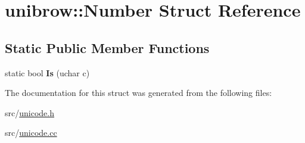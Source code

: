 \hypertarget{structunibrow_1_1_number}{}\section{unibrow\+:\+:Number Struct Reference}
\label{structunibrow_1_1_number}
\subsection*{Static Public Member Functions}
\begin{DoxyCompactItemize}
\item 
\hypertarget{structunibrow_1_1_number_a386425bc3c0465d965e380e7fd2d0f87}{}static bool {\bfseries Is} (uchar c)\label{structunibrow_1_1_number_a386425bc3c0465d965e380e7fd2d0f87}

\end{DoxyCompactItemize}


The documentation for this struct was generated from the following files\+:\begin{DoxyCompactItemize}
\item 
src/\hyperlink{unicode_8h}{unicode.\+h}\item 
src/\hyperlink{unicode_8cc}{unicode.\+cc}\end{DoxyCompactItemize}

